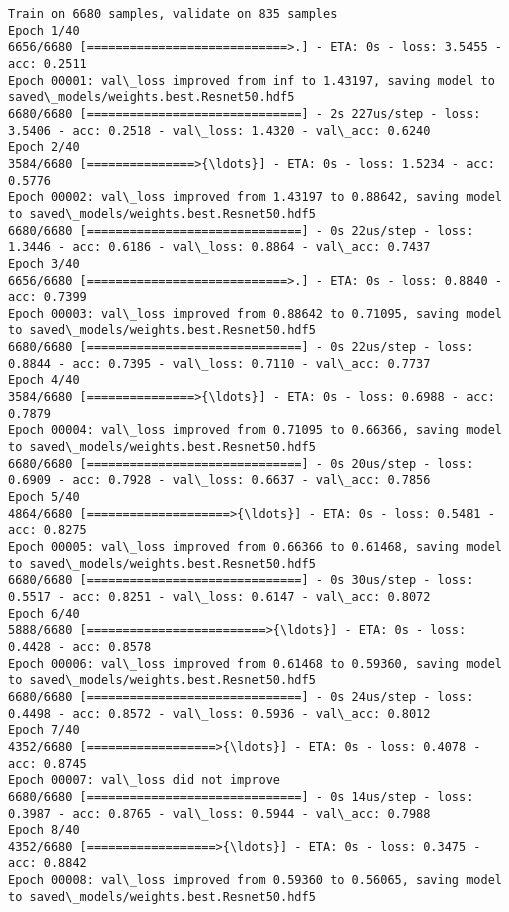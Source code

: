 \documentclass[11pt]{article}
\begin{document}
    \begin{Verbatim}[commandchars=\\\{\}]
Train on 6680 samples, validate on 835 samples
Epoch 1/40
6656/6680 [============================>.] - ETA: 0s - loss: 3.5455 - acc: 0.2511
Epoch 00001: val\_loss improved from inf to 1.43197, saving model to saved\_models/weights.best.Resnet50.hdf5
6680/6680 [==============================] - 2s 227us/step - loss: 3.5406 - acc: 0.2518 - val\_loss: 1.4320 - val\_acc: 0.6240
Epoch 2/40
3584/6680 [===============>{\ldots}] - ETA: 0s - loss: 1.5234 - acc: 0.5776
Epoch 00002: val\_loss improved from 1.43197 to 0.88642, saving model to saved\_models/weights.best.Resnet50.hdf5
6680/6680 [==============================] - 0s 22us/step - loss: 1.3446 - acc: 0.6186 - val\_loss: 0.8864 - val\_acc: 0.7437
Epoch 3/40
6656/6680 [============================>.] - ETA: 0s - loss: 0.8840 - acc: 0.7399
Epoch 00003: val\_loss improved from 0.88642 to 0.71095, saving model to saved\_models/weights.best.Resnet50.hdf5
6680/6680 [==============================] - 0s 22us/step - loss: 0.8844 - acc: 0.7395 - val\_loss: 0.7110 - val\_acc: 0.7737
Epoch 4/40
3584/6680 [===============>{\ldots}] - ETA: 0s - loss: 0.6988 - acc: 0.7879
Epoch 00004: val\_loss improved from 0.71095 to 0.66366, saving model to saved\_models/weights.best.Resnet50.hdf5
6680/6680 [==============================] - 0s 20us/step - loss: 0.6909 - acc: 0.7928 - val\_loss: 0.6637 - val\_acc: 0.7856
Epoch 5/40
4864/6680 [====================>{\ldots}] - ETA: 0s - loss: 0.5481 - acc: 0.8275
Epoch 00005: val\_loss improved from 0.66366 to 0.61468, saving model to saved\_models/weights.best.Resnet50.hdf5
6680/6680 [==============================] - 0s 30us/step - loss: 0.5517 - acc: 0.8251 - val\_loss: 0.6147 - val\_acc: 0.8072
Epoch 6/40
5888/6680 [=========================>{\ldots}] - ETA: 0s - loss: 0.4428 - acc: 0.8578
Epoch 00006: val\_loss improved from 0.61468 to 0.59360, saving model to saved\_models/weights.best.Resnet50.hdf5
6680/6680 [==============================] - 0s 24us/step - loss: 0.4498 - acc: 0.8572 - val\_loss: 0.5936 - val\_acc: 0.8012
Epoch 7/40
4352/6680 [==================>{\ldots}] - ETA: 0s - loss: 0.4078 - acc: 0.8745
Epoch 00007: val\_loss did not improve
6680/6680 [==============================] - 0s 14us/step - loss: 0.3987 - acc: 0.8765 - val\_loss: 0.5944 - val\_acc: 0.7988
Epoch 8/40
4352/6680 [==================>{\ldots}] - ETA: 0s - loss: 0.3475 - acc: 0.8842
Epoch 00008: val\_loss improved from 0.59360 to 0.56065, saving model to saved\_models/weights.best.Resnet50.hdf5

\end{Verbatim}
\end{document}
